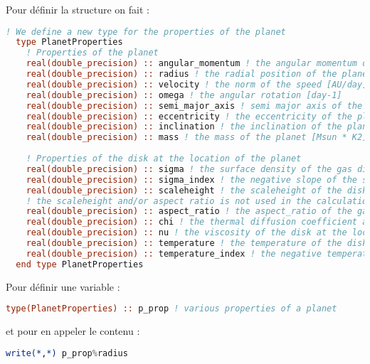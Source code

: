 Pour définir la structure on fait : 
\begin{lstlisting}[language=Fortran]
  ! We define a new type for the properties of the planet
  type PlanetProperties
    ! Properties of the planet
    real(double_precision) :: angular_momentum ! the angular momentum of the planet [Ms.AU^2.day^-1]
    real(double_precision) :: radius ! the radial position of the planet [AU]
    real(double_precision) :: velocity ! the norm of the speed [AU/day]
    real(double_precision) :: omega ! the angular rotation [day-1]
    real(double_precision) :: semi_major_axis ! semi major axis of the planet [AU]
    real(double_precision) :: eccentricity ! the eccentricity of the planet
    real(double_precision) :: inclination ! the inclination of the planet [rad]
    real(double_precision) :: mass ! the mass of the planet [Msun * K2]
    
    ! Properties of the disk at the location of the planet
    real(double_precision) :: sigma ! the surface density of the gas disk at the planet location [MSUN.AU^-2]
    real(double_precision) :: sigma_index ! the negative slope of the surface density profile at the location of the planet.
    real(double_precision) :: scaleheight ! the scaleheight of the disk at the location of the planet [AU]
    ! the scaleheight and/or aspect ratio is not used in the calculation of the turbulence, where the value 0.05 is used directly into the code
    real(double_precision) :: aspect_ratio ! the aspect_ratio of the gas disk at the location of the planet [no dim]
    real(double_precision) :: chi ! the thermal diffusion coefficient at the location of the planet [AU^2.day^-1]
    real(double_precision) :: nu ! the viscosity of the disk at the location of the planet [AU^2.day^-1]
    real(double_precision) :: temperature ! the temperature of the disk at the location of the planet [K] 
    real(double_precision) :: temperature_index ! the negative temperature index of the disk at the location of the planet [no dim] 
  end type PlanetProperties
\end{lstlisting}

Pour définir une variable : 
\begin{lstlisting}[language=Fortran]
  type(PlanetProperties) :: p_prop ! various properties of a planet
\end{lstlisting}
et pour en appeler le contenu : 
\begin{lstlisting}[language=Fortran]
write(*,*) p_prop%radius
\end{lstlisting}



